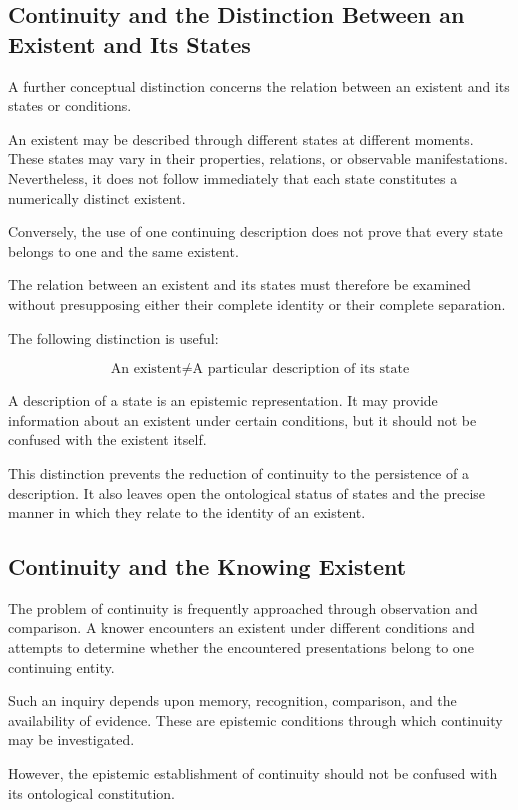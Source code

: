 \subsection{Continuity and the Distinction Between an Existent and Its States}

A further conceptual distinction concerns the relation between an existent and its states or conditions.

An existent may be described through different states at different moments. These states may vary in their properties, relations, or observable manifestations. Nevertheless, it does not follow immediately that each state constitutes a numerically distinct existent.

Conversely, the use of one continuing description does not prove that every state belongs to one and the same existent.

The relation between an existent and its states must therefore be examined without presupposing either their complete identity or their complete separation.

The following distinction is useful:

\[
\text{An existent} \neq \text{A particular description of its state}
\]

A description of a state is an epistemic representation. It may provide information about an existent under certain conditions, but it should not be confused with the existent itself.

This distinction prevents the reduction of continuity to the persistence of a description. It also leaves open the ontological status of states and the precise manner in which they relate to the identity of an existent.

\subsection{Continuity and the Knowing Existent}

The problem of continuity is frequently approached through observation and comparison. A knower encounters an existent under different conditions and attempts to determine whether the encountered presentations belong to one continuing entity.

Such an inquiry depends upon memory, recognition, comparison, and the availability of evidence. These are epistemic conditions through which continuity may be investigated.

However, the epistemic establishment of continuity should not be confused with its ontological constitution.

